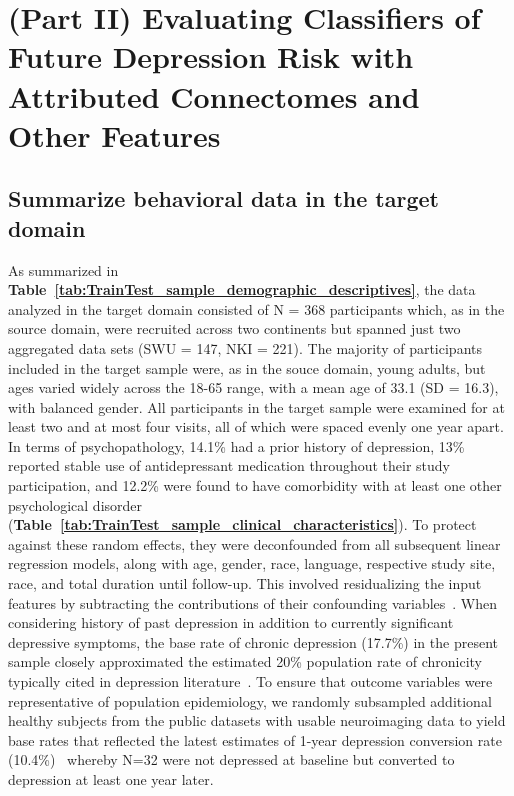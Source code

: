 \documentclass[
  notitlepage]{article}
\begin{document}
\hypertarget{part-ii-evaluating-classifiers-of-future-depression-risk-with-attributed-connectomes-and-other-features}{%
\section{(Part II) Evaluating Classifiers of Future Depression Risk with
Attributed Connectomes and Other
Features}\label{part-ii-evaluating-classifiers-of-future-depression-risk-with-attributed-connectomes-and-other-features}}

\hypertarget{summarize-behavioral-data-in-the-target-domain}{%
\subsection{Summarize behavioral data in the target
domain}\label{summarize-behavioral-data-in-the-target-domain}}
As summarized in \textbf{Table~\ref{tab:TrainTest_sample_demographic_descriptives}}, the data analyzed in the target domain consisted of N = 368 participants which, as in the
source domain, were recruited across two continents but spanned just two
aggregated data sets (SWU = 147, NKI = 221). The majority of
participants included in the target sample were, as in the souce
domain, young adults, but ages varied widely across the 18-65 range,
with a mean age of 33.1 (SD = 16.3), with balanced gender. All
participants in the target sample were examined for at least two and at most four visits, all of which were spaced evenly one year apart. In terms of psychopathology, 14.1\% had a prior history of depression, 13\% reported stable use of antidepressant medication throughout their study
participation, and 12.2\% were found to have comorbidity with at least
one other psychological disorder (\textbf{Table~\ref{tab:TrainTest_sample_clinical_characteristics}}). To protect against
these random effects, they were deconfounded from all subsequent linear
regression models, along with age, gender, race, language, respective
study site, race, and total duration until follow-up. This involved
residualizing the input features by subtracting the contributions of
their confounding variables~\cite{Chyzhyk2018,Rao2017}.
When considering history of past depression in addition to currently
significant depressive symptoms, the base rate of chronic depression
(17.7\%) in the present sample closely approximated the estimated 20\%
population rate of chronicity typically cited in depression
literature~\cite{Vos2004}. To ensure that outcome
variables were representative of population epidemiology, we randomly
subsampled additional healthy subjects from the public datasets with
usable neuroimaging data to yield base rates that reflected the latest
estimates of 1-year depression conversion rate
(10.4\%)~\cite{Ettman2020} whereby N=32 were not
depressed at baseline but converted to depression at least one year
later.
\end{document}
